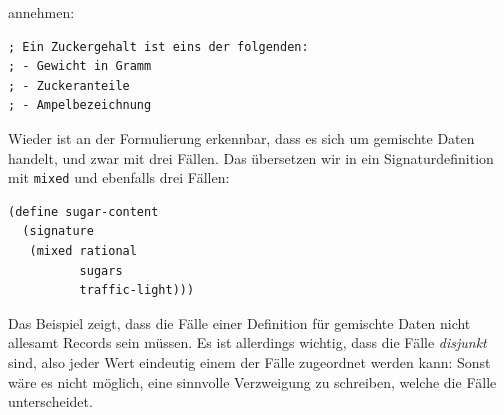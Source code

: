 annehmen:
%
\begin{lstlisting}
; Ein Zuckergehalt ist eins der folgenden:
; - Gewicht in Gramm
; - Zuckeranteile
; - Ampelbezeichnung
\end{lstlisting}
%
Wieder ist an der Formulierung erkennbar, dass es sich um gemischte
Daten handelt, und zwar mit drei Fällen.  Das übersetzen wir in ein
Signaturdefinition mit \lstinline{mixed} und ebenfalls drei Fällen:
%
\begin{lstlisting}
(define sugar-content
  (signature
   (mixed rational
          sugars
          traffic-light)))
\end{lstlisting}
%
Das Beispiel zeigt, dass die Fälle einer Definition für gemischte Daten
nicht allesamt Records sein müssen.  Es ist allerdings wichtig, dass
die Fälle \emph{disjunkt} sind, also jeder Wert eindeutig einem der
Fälle zugeordnet werden kann: Sonst wäre es nicht möglich, eine sinnvolle
Verzweigung zu schreiben, welche die Fälle unterscheidet.

